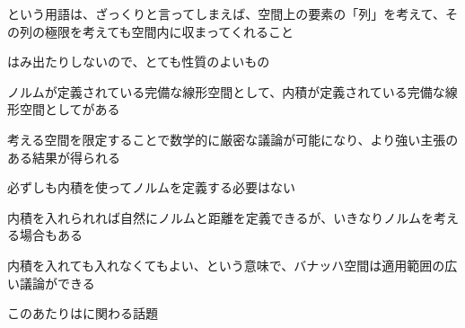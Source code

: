 \documentclass[../book_half_step_linear]{subfiles}
\begin{document}
という用語は、ざっくりと言ってしまえば、空間上の要素の「列」を考えて、その列の極限を考えても空間内に収まってくれること

はみ出たりしないので、とても性質のよいもの

\br

ノルムが定義されている完備な線形空間として、内積が定義されている完備な線形空間としてがある

考える空間を限定することで数学的に厳密な議論が可能になり、より強い主張のある結果が得られる

\br

必ずしも内積を使ってノルムを定義する必要はない

内積を入れられれば自然にノルムと距離を定義できるが、いきなりノルムを考える場合もある

内積を入れても入れなくてもよい、という意味で、バナッハ空間は適用範囲の広い議論ができる

このあたりはに関わる話題
\end{document}
